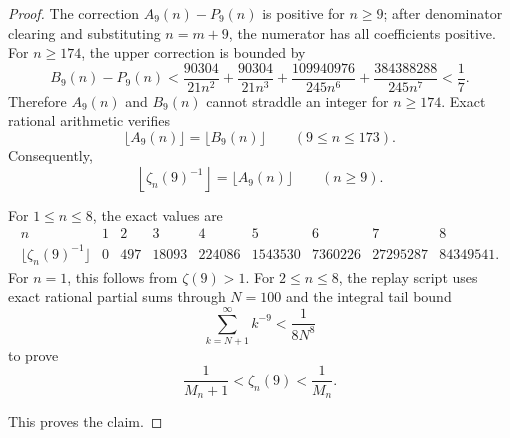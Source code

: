 \begin{proof}
The correction \(A_9(n)-P_9(n)\) is positive for \(n\ge9\); after denominator clearing and substituting \(n=m+9\), the numerator has all coefficients positive. For \(n\ge174\), the upper correction is bounded by
\[
B_9(n)-P_9(n)
<
\frac{90304}{21n^2}
+\frac{90304}{21n^3}
+\frac{109940976}{245n^6}
+\frac{384388288}{245n^7}
<\frac17.
\]
Therefore \(A_9(n)\) and \(B_9(n)\) cannot straddle an integer for \(n\ge174\). Exact rational arithmetic verifies
\[
\lfloor A_9(n)\rfloor=\lfloor B_9(n)\rfloor
\qquad(9\le n\le173).
\]
Consequently,
\[
\left\lfloor\zeta_n(9)^{-1}\right\rfloor=\lfloor A_9(n)\rfloor
\qquad(n\ge9).
\]

For \(1\le n\le8\), the exact values are
\[
\begin{array}{c|rrrrrrrr}
n&1&2&3&4&5&6&7&8\\
\hline
\lfloor\zeta_n(9)^{-1}\rfloor&0&497&18093&224086&1543530&7360226&27295287&84349541.
\end{array}
\]
For \(n=1\), this follows from \(\zeta(9)>1\). For \(2\le n\le8\), the replay script uses exact rational partial sums through \(N=100\) and the integral tail bound
\[
\sum_{k=N+1}^{\infty}k^{-9}<\frac{1}{8N^8}
\]
to prove
\[
\frac1{M_n+1}<\zeta_n(9)<\frac1{M_n}.
\]

This proves the claim.
\end{proof}

